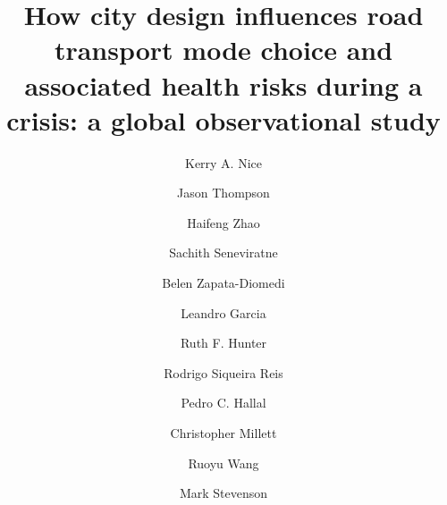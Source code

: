 \documentclass[preprint,10pt]{elsarticle} %
\begin{document}
\begin{frontmatter}

\title{How city design influences road transport mode choice and associated health risks during a crisis: a global observational study}

\author[melb]{Kerry A. Nice}
\author[melb,sun]{Jason Thompson}
\author[melb]{Haifeng Zhao}
\author[melb]{Sachith Seneviratne}
\author[RMII]{Belen Zapata-Diomedi}
\author[Belfast,phy]{Leandro Garcia}
\author[Belfast]{Ruth F. Hunter}
\author[wash]{Rodrigo Siqueira Reis}
\author[uill,PPE]{Pedro C. Hallal}
\author[imp,nova,ieps]{Christopher Millett}
\author[Belfast]{Ruoyu Wang}
\author[melb,eng]{Mark Stevenson}

\address[melb]{Transport, Health, and Urban Systems Research Lab, Faculty of Architecture, Building, and Planning, University of Melbourne, VIC, Australia}
\address[eng]{Faculty of Engineering and Information Technology and the Melbourne School of Population and Global Health, University of Melbourne, VIC, Australia}
\address[sun]{Centre for Human Factors and Sociotechnical Systems University of the Sunshine Coast, Queensland, Australia}
\address[RMII]{Healthy Liveable Cities Lab, Centre for Urban Research, RMIT University, Melbourne, Australia}
\address[Belfast]{Centre for Public Health, Queen’s University Belfast, Institute of Clinical Sciences B, Belfast, Northern Ireland, UK}
\address[wash]{Washington University, St. Louis, Missouri, US}
\address[uill]{Department of Kinesiology and Community Health, University of Illinois Urbana-Champaign}
\address[imp]{Public Health Policy Evaluation Unit, School of Public Health, Imperial College London, London, United Kingdom}
\address[nova]{NOVA National School of Public Health, Public Health Research Centre, Comprehensive Health Research Center (CHRC), NOVA University Lisbon, Lisbon, Portugal}
\address[ieps]{Instituto de Estudos para Políticas de Saúde (IEPS), São Paulo, Brazil}
\address[PPE]{Postgraduate Program in Epidemiology, Federal University of Pelotas, Brazil}
\address[phy]{Physical Activity Epidemiology Group, University of São Paulo, São Paulo, Brazil}



\end{frontmatter}
\end{document}
